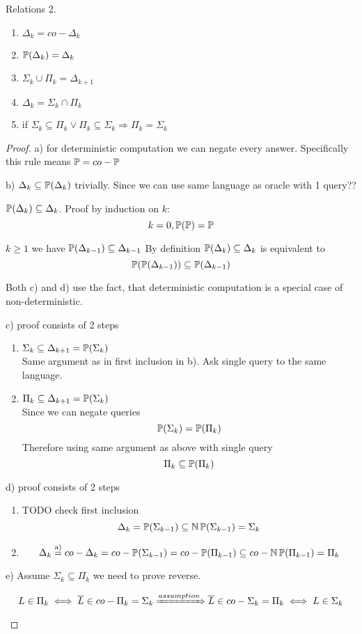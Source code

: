 \begin{properties} Relations 2.
	\begin{enumerate}[label=\alph*)]
		\item $\Delta_k = co-\Delta_k$
		\item $\operatorname{\mathbb{P}}(\Delta_k) = \Delta_k$
		\item $\Sigma_k \cup \Pi_k = \Delta_{k + 1}$
		\item $\Delta_k = \Sigma_k \cap \Pi_k$
		\item if $\Sigma_k \subseteq \Pi_k \lor \Pi_k \subseteq \Sigma_k \Rightarrow \Pi_k = \Sigma_k$
	\end{enumerate}
\end{properties}
\begin{proof}
	a) for deterministic computation we can negate every answer.
	Specifically this rule means $\operatorname{\mathbb{P}} = co-\operatorname{\mathbb{P}}$

	b) $\Delta_k \subseteq \operatorname{\mathbb{P}}(\Delta_k)$ trivially. Since we can use same language as oracle with 1 query??

	$\operatorname{\mathbb{P}}(\Delta_k) \subseteq \Delta_k$. Proof by induction on $k$:
	\[ k = 0, \operatorname{\mathbb{P}}(\operatorname{\mathbb{P}}) = \operatorname{\mathbb{P}} \]

	$k \geq 1$ we have $\operatorname{\mathbb{P}}(\Delta_{k - 1}) \subseteq \Delta_{k - 1}$
	By definition $\operatorname{\mathbb{P}}(\Delta_k) \subseteq \Delta_k$ is equivalent to
	\[ \operatorname{\mathbb{P}}(\operatorname{\mathbb{P}}(\Delta_{k - 1})) \subseteq \operatorname{\mathbb{P}}(\Delta_{k - 1}) \]

	Both c) and d) use the fact, that deterministic computation is a special case of non-deterministic.

	c) proof consists of 2 steps
	\begin{enumerate}
		\item $\Sigma_k \subseteq \Delta_{k + 1} = \operatorname{\mathbb{P}}(\Sigma_k)$\\
			Same argument as in first inclusion in b).
			Ask single query to the same language.
		\item $\Pi_k \subseteq \Delta_{k + 1} = \operatorname{\mathbb{P}}(\Sigma_k)$\\
			Since we can negate queries
			\[ \operatorname{\mathbb{P}}(\Sigma_k) = \operatorname{\mathbb{P}}(\Pi_k) \]
			Therefore using same argument as above with single query
			\[ \Pi_k \subseteq \operatorname{\mathbb{P}}(\Pi_k) \]
	\end{enumerate}

	d) proof consists of 2 steps
	\begin{enumerate}
		\item TODO check first inclusion
			\[ \Delta_k = \operatorname{\mathbb{P}}(\Sigma_{k - 1}) \subseteq \operatorname{\operatorname{\mathbb{N}}\mathbb{P}}(\Sigma_{k - 1}) = \Sigma_k \]
		\item
			\[ \Delta_k \stackrel{\text{a)}}{=} co-\Delta_k = co-\operatorname{\mathbb{P}}(\Sigma_{k - 1}) = co-\operatorname{\mathbb{P}}(\Pi_{k - 1}) \subseteq co-\operatorname{\operatorname{\mathbb{N}}\mathbb{P}}(\Pi_{k - 1}) = \Pi_k \]
	\end{enumerate}

	e) Assume $\Sigma_k \subseteq \Pi_k$ we need to prove reverse.

	\[ L \in \Pi_k \iff \overline{L} \in co-\Pi_k = \Sigma_k \xRightarrow{assumption} \overline{L} \in co-\Sigma_k = \Pi_k \iff L \in \Sigma_k  \]
\end{proof}

